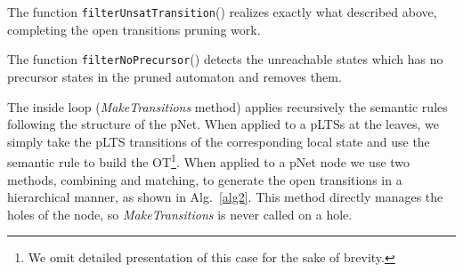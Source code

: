 \documentclass[smallcondensed]{svjour3}
\newcommand{\noteSB}[2][color=green!40, size=\tiny]{\todo[#1]{{\bf
      Note: } {#2}}}
\newcommand{\noteEM}[2][color=blue!40, size=\tiny]{\todo[#1]{{\bf Eric: } {#2}}}
\newcommand{\noteInSB}[2][inline,color=green!40]{\todo[#1]{{\bf Simon: } {#2}}}
\newcommand{\QIN}[1]{\textcolor{airforceblue}{#1}}
\newcommand{\mdash}{---}
\begin{document}
\QIN{The function \texttt{filterUnsatTransition}() realizes exactly what described above, completing the open transitions pruning work.}

\QIN{The function \texttt{filterNoPrecursor}() detects the unreachable states which has no precursor states in the pruned automaton and removes them.}

The inside loop (\emph{MakeTransitions} method) applies recursively
the semantic rules following the structure of the pNet.
When applied to a pLTSs at the leaves, we simply take the pLTS transitions of the
corresponding local state and use the semantic rule to build the OT\footnote{%
%
  We omit detailed presentation of this case for the sake of brevity.
%
}.
When applied to a pNet node we use two methods, combining and
matching, to generate the open transitions in a hierarchical manner,
as shown in Alg.~\ref{alg2}. This method directly manages the
holes of the node, so \emph{MakeTransitions} is never called on a hole.


%



\end{document}
